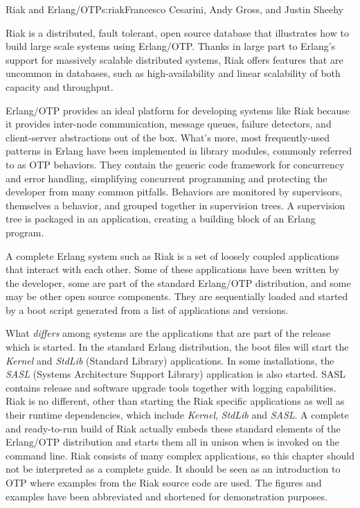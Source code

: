\begin{aosachapter}{Riak and Erlang/OTP}{s:riak}{Francesco Cesarini, Andy Gross, and Justin Sheehy}

Riak is a distributed, fault tolerant, open source database that
illustrates how to build large scale systems using Erlang/OTP\@.  Thanks
in large part to Erlang's support for massively scalable distributed
systems, Riak offers features that are uncommon in databases, such as
high-availability and linear scalability of both capacity and
throughput.

Erlang/OTP provides an ideal platform for developing systems like Riak
because it provides inter-node communication, message queues, failure
detectors, and client-server abstractions out of the box.  What's
more, most frequently-used patterns in Erlang have been implemented
in library modules, commonly referred to as OTP behaviors. They
contain the generic code framework for concurrency and error handling,
simplifying concurrent programming and protecting
the developer from many common pitfalls. Behaviors are monitored by
supervisors, themselves a behavior, and grouped together in
supervision trees. A supervision tree is packaged in an application,
creating a building block of an Erlang program.

A complete Erlang system such as Riak is a set of loosely coupled
applications that interact with each other. Some of these applications
have been written by the developer, some are part of the standard
Erlang/OTP distribution, and some may be other open source
components. They are sequentially loaded and started by a boot script
generated from a list of applications and versions.

What \emph{differs} among systems are the applications that are part
of the release which is started. In the standard Erlang distribution,
the boot files will start the \emph{Kernel} and \emph{StdLib}
(Standard Library) applications. In some installations, the
\emph{SASL} (Systems Architecture Support Library) application is also
started. SASL contains release and software upgrade tools together
with logging capabilities. Riak is no different, other than starting
the Riak specific applications as well as their runtime dependencies,
which include \emph{Kernel}, \emph{StdLib} and \emph{SASL}. A complete and
ready-to-run build of Riak actually embeds these standard elements of
the Erlang/OTP distribution and starts them all in unison when
 is invoked on the command line. Riak consists of
many complex applications, so this chapter should not be
interpreted as a complete guide. It should be seen as an introduction
to OTP where examples from the Riak source code are used. The figures
and examples have been abbreviated and shortened for demonstration
purposes.


\end{aosachapter}
